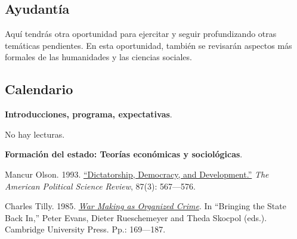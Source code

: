 \documentclass[letterpaper]{article}
\renewenvironment{itemize}{
  \begin{list}{}{
    \setlength{\leftmargin}{1.5em}
  }
}{
  \end{list}
}
\begin{document}
\subsection*{Ayudant\'ia}

Aqu\'i tendr\'as otra oportunidad para ejercitar y seguir profundizando otras tem\'aticas pendientes. En esta oportunidad, tambi\'en se revisar\'an aspectos m\'as formales de las humanidades y las ciencias sociales. 


\subsection*{Calendario}



\begin{enumerate}[label=\roman*.]

  \item {}
    \begin{itemize}
      \item[1.] {\bf Introducciones, programa, expectativas}.
        \begin{itemize} 
          \item[$\circ$] No hay lecturas.
        \end{itemize}
    \end{itemize}


	\item {}
		\begin{itemize}
			
			\item[2.] {\bf Formaci\'on del estado: Teor\'ias econ\'omicas y sociol\'ogicas}.
				\begin{itemize} 
					\item[$\circ$] Mancur Olson. 1993. \href{https://github.com/hbahamonde/Ciencia_Politica_II/raw/master/Readings/Olson.pdf}{``Dictatorship, Democracy, and Development.''} \emph{The American Political Science Review}, 87(3): 567---576.
					
					\item[$\circ$] Charles Tilly. 1985. \href{https://github.com/hbahamonde/Ciencia_Politica_II/raw/master/Readings/Tilly.pdf}{\emph{War Making as Organized Crime}}. In ``Bringing the State Back In,'' Peter Evans, Dieter Rueschemeyer and Theda Skocpol (eds.). Cambridge University Press. Pp.: 169---187.
				\end{itemize}
			

\end{itemize}
\end{enumerate}
\end{document}
